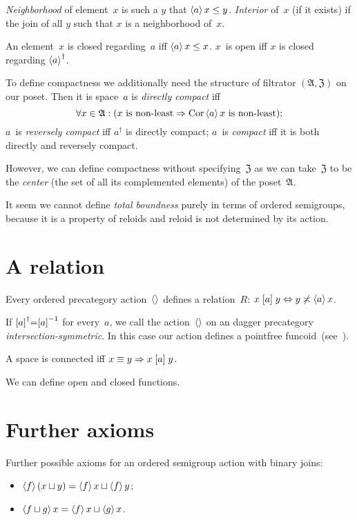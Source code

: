 \emph{Neighborhood} of element~$x$ is such a $y$ that $\left\langle a\right\rangle x\leq y$. \emph{Interior} of~$x$ (if it exists) if the join of all $y$ such that $x$ is a neighborhood of~$x$.

An element~$x$ is closed regarding~$a$ iff $\left\langle a\right\rangle x\leq x$. $x$~is open iff $x$ is closed regarding $\left\langle a\right\rangle^{\dagger}$.

To define compactness we additionally need the structure of filtrator $(\mathfrak{A},\mathfrak{Z})$ on our poset. Then it is space~$a$ is \emph{directly compact} iff
\[\forall x\in\mathfrak{A}:(x\text{ is non-least}\Rightarrow\operatorname{Cor}\left\langle a\right\rangle x\text{ is non-least}); \]
$a$~is \emph{reversely compact} iff $a^{\dagger}$ is directly compact; $a$~is \emph{compact} iff it is both directly and reversely compact.

However, we can define compactness without specifying~$\mathfrak{Z}$ as we can take~$\mathfrak{Z}$ to be the \emph{center} (the set of all its complemented elements) of the poset~$\mathfrak{A}$.

It seem we cannot define \emph{total boundness} purely in terms of ordered semigroups, because it is a property of reloids and reloid is not determined by its action.

\chapter{A relation}

Every ordered precategory action~$\left\langle \right\rangle$ defines a relation~$R$: $x\mathrel{\left[a\right]}y\Leftrightarrow y\not\asymp\left\langle a\right\rangle x$.

If $\mathrel{\left[a\right]}^{\dagger}=\mathrel{\left[a\right]}^{-1}$ for every~$a$, we call the action~$\left\langle \right\rangle$ on an dagger precategory \emph{inter\-sec\-tion-sym\-met\-ric}. In this case our action defines a pointfree funcoid~(see~\cite{volume-1}).

A space is connected iff $x\equiv y\Rightarrow x\mathrel{\left[a\right]}y$.

We can define open and closed functions.

\chapter{Further axioms}

Further possible axioms for an ordered semigroup action with binary joins:

\begin{itemize}
\item $\left\langle f\right\rangle(x\sqcup y)=\left\langle f\right\rangle x\sqcup\left\langle f\right\rangle y$;
\item $\left\langle f\sqcup g\right\rangle x=\left\langle f\right\rangle x\sqcup\left\langle g\right\rangle x$.
\end{itemize}

